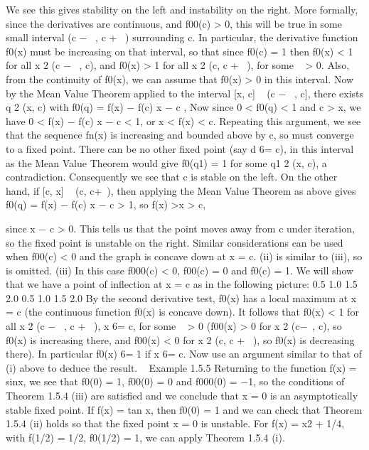 \documentclass[12pt]{article}
\begin{document}
\begin{enumerate}
\begin{enumerate}
We see this gives stability on the left and instability on the right.
More formally, since the derivatives are continuous, and f00(c) > 0, this will be
true in some small interval (c −  , c +  ) surrounding c. In particular, the derivative
function f0(x) must be increasing on that interval, so that since f0(c) = 1 then
f0(x) < 1 for all x 2 (c −  , c), and f0(x) > 1 for all x 2 (c, c +  ),
for some   > 0. Also, from the continuity of f0(x), we can assume that f0(x) > 0 in
this interval.
Now by the Mean Value Theorem applied to the interval [x, c]   (c −  , c], there
exists q 2 (x, c) with
f0(q) =
f(x) − f(c)
x − c
,
Now since 0 < f0(q) < 1 and c > x, we have
0 <
f(x) − f(c)
x − c
< 1,
or
x < f(x) < c.
Repeating this argument, we see that the sequence fn(x) is increasing and bounded
above by c, so must converge to a fixed point. There can be no other fixed point (say
d 6= c), in this interval as the Mean Value Theorem would give f0(q1) = 1 for some
q1 2 (x, c), a contradiction. Consequently we see that c is stable on the left.
On the other hand, if [c, x]   (c, c+ ), then applying the Mean Value Theorem as
above gives
f0(q) =
f(x) − f(c)
x − c
> 1, so f(x) >x > c,

since x − c > 0. This tells us that the point moves away from c under iteration, so
the fixed point is unstable on the right. Similar considerations can be used when
f00(c) < 0 and the graph is concave down at x = c.
(ii) is similar to (iii), so is omitted.
(iii) In this case f000(c) < 0, f00(c) = 0 and f0(c) = 1. We will show that we have a
point of inflection at x = c as in the following picture:
0.5 1.0 1.5 2.0
0.5
1.0
1.5
2.0
By the second derivative test, f0(x) has a local maximum at x = c (the continuous
function f0(x) is concave down). It follows that
f0(x) < 1 for all x 2 (c −  , c +  ), x 6= c,
for some   > 0 (f00(x) > 0 for x 2 (c− , c), so f0(x) is increasing there, and f00(x) < 0
for x 2 (c, c +  ), so f0(x) is decreasing there). In particular f0(x) 6= 1 if x 6= c.
Now use an argument similar to that of (i) above to deduce the result.  
Example 1.5.5 Returning to the function f(x) = sinx, we see that f0(0) = 1,
f00(0) = 0 and f000(0) = −1, so the conditions of Theorem 1.5.4 (iii) are satisfied and
we conclude that x = 0 is an asymptotically stable fixed point.
If f(x) = tan x, then f0(0) = 1 and we can check that Theorem 1.5.4 (ii) holds
so that the fixed point x = 0 is unstable. For f(x) = x2 + 1/4, with f(1/2) = 1/2,
f0(1/2) = 1, we can apply Theorem 1.5.4 (i).


\end{enumerate}
\end{enumerate}
\end{document}
